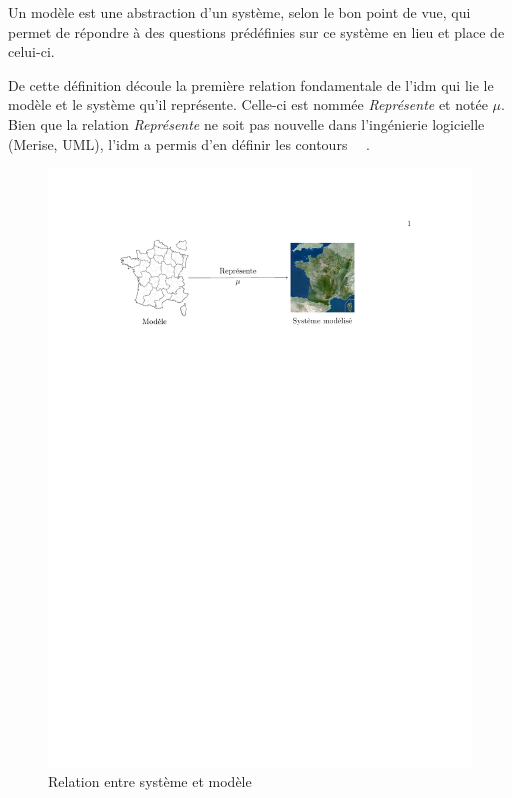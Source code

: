 \begin{definition}
Un modèle est une abstraction d'un système, selon le bon point de vue, qui 
permet de répondre à des questions prédéfinies sur ce système en lieu et place 
de celui-ci.
\end{definition}

De cette définition découle la première relation fondamentale de l'\gls{idm} qui lie 
le modèle et le système qu'il représente. Celle-ci est nommée 
\textit{Représente} et notée $\mu$. Bien que la relation 
\textit{Représente} ne soit pas nouvelle dans l'ingénierie logicielle 
(Merise, UML), l'\gls{idm} a permis d'en définir les contours~\cite{atkinson2003model} 
\cite{seidewitz2003models}~\cite{bezivin2004search}.

\begin{figure}[!ht]
    \centering
    \includegraphics[trim=100 620 150 100, clip]{figures/3_etat_de_l_art_IDM/modele_france.pdf} %
    \caption{Relation entre système et modèle~\protect\cite{favre2006ingenierie}}
    \label{fig:systemModele}
\end{figure}

